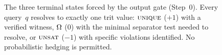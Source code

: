\begin{figure}[htbp]
\caption{The three terminal states forced by the output gate (Step~0).
  Every query~$q$ resolves to exactly one trit value:
  $\textsc{unique}$ ($+1$) with a verified witness,
  $\Omega$ ($0$) with the minimal separator test needed to resolve,
  or $\textsc{unsat}$ ($-1$) with specific violations identified.
  No probabilistic hedging is permitted.}
\label{fig:trit-states}
\end{figure}
